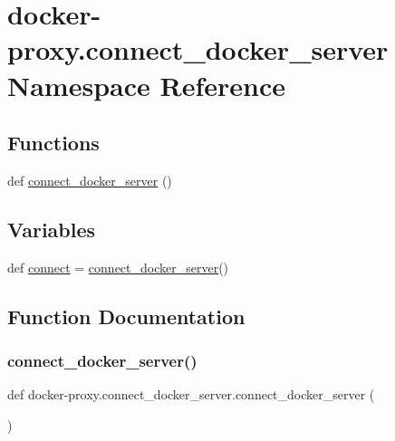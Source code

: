 \hypertarget{namespacedocker-proxy_1_1connect__docker__server}{}\section{docker-\/proxy.connect\+\_\+docker\+\_\+server Namespace Reference}
\label{namespacedocker-proxy_1_1connect__docker__server}
\subsection*{Functions}
\begin{DoxyCompactItemize}
\item 
def \hyperlink{namespacedocker-proxy_1_1connect__docker__server_a5a405d25b986678755c9a1aedeb066f8}{connect\+\_\+docker\+\_\+server} ()
\end{DoxyCompactItemize}
\subsection*{Variables}
\begin{DoxyCompactItemize}
\item 
def \hyperlink{namespacedocker-proxy_1_1connect__docker__server_aa7f3f87149d03ba3fd92b1b60a011454}{connect} = \hyperlink{namespacedocker-proxy_1_1connect__docker__server_a5a405d25b986678755c9a1aedeb066f8}{connect\+\_\+docker\+\_\+server}()
\end{DoxyCompactItemize}


\subsection{Function Documentation}
\hypertarget{namespacedocker-proxy_1_1connect__docker__server_a5a405d25b986678755c9a1aedeb066f8}{}\label{namespacedocker-proxy_1_1connect__docker__server_a5a405d25b986678755c9a1aedeb066f8} 
\subsubsection{\texorpdfstring{connect\+\_\+docker\+\_\+server()}{connect\_docker\_server()}}
{\footnotesize\ttfamily def docker-\/proxy.\+connect\+\_\+docker\+\_\+server.\+connect\+\_\+docker\+\_\+server (\begin{DoxyParamCaption}{ }\end{DoxyParamCaption})}



